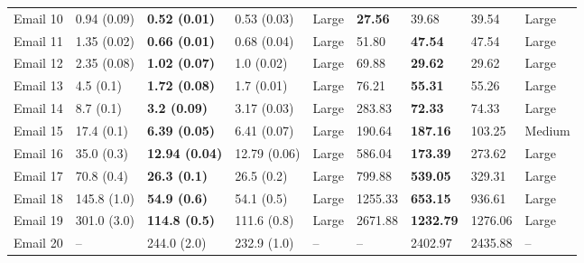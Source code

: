 \begin{tabular}{lllllllll}
Email 10 &       0.94 (0.09) &   \textbf{0.52 (0.01)} &        0.53 (0.03) &       Large &          \textbf{27.56} &                       39.68 &                    39.54 &       Large \\
Email 11 &       1.35 (0.02) &   \textbf{0.66 (0.01)} &        0.68 (0.04) &       Large &                   51.80 &              \textbf{47.54} &                    47.54 &       Large \\
Email 12 &       2.35 (0.08) &   \textbf{1.02 (0.07)} &         1.0 (0.02) &       Large &                   69.88 &              \textbf{29.62} &                    29.62 &       Large \\
Email 13 &         4.5 (0.1) &   \textbf{1.72 (0.08)} &         1.7 (0.01) &       Large &                   76.21 &              \textbf{55.31} &                    55.26 &       Large \\
Email 14 &         8.7 (0.1) &    \textbf{3.2 (0.09)} &        3.17 (0.03) &       Large &                  283.83 &              \textbf{72.33} &                    74.33 &       Large \\
Email 15 &        17.4 (0.1) &   \textbf{6.39 (0.05)} &        6.41 (0.07) &       Large &                  190.64 &             \textbf{187.16} &                   103.25 &      Medium \\
Email 16 &        35.0 (0.3) &  \textbf{12.94 (0.04)} &       12.79 (0.06) &       Large &                  586.04 &             \textbf{173.39} &                   273.62 &       Large \\
Email 17 &        70.8 (0.4) &    \textbf{26.3 (0.1)} &         26.5 (0.2) &       Large &                  799.88 &             \textbf{539.05} &                   329.31 &       Large \\
Email 18 &       145.8 (1.0) &    \textbf{54.9 (0.6)} &         54.1 (0.5) &       Large &                 1255.33 &             \textbf{653.15} &                   936.61 &       Large \\
Email 19 &       301.0 (3.0) &   \textbf{114.8 (0.5)} &        111.6 (0.8) &       Large &                 2671.88 &            \textbf{1232.79} &                  1276.06 &       Large \\
Email 20 &                -- &            244.0 (2.0) &        232.9 (1.0) &          -- &                      -- &                     2402.97 &                  2435.88 &          -- \\
\bottomrule
\end{tabular}
